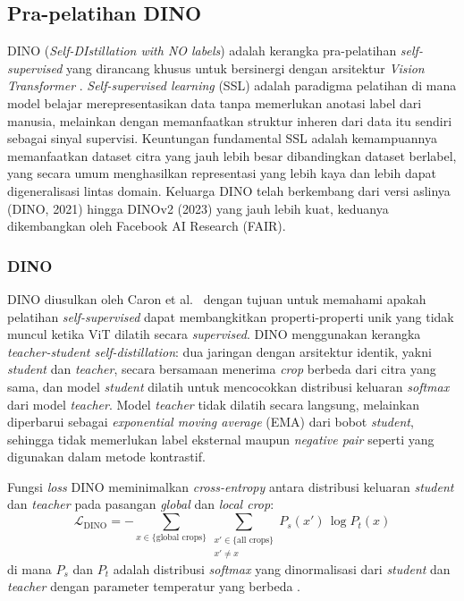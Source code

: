 \subsection{Pra-pelatihan DINO}
DINO (\textit{Self-DIstillation with NO labels}) adalah kerangka pra-pelatihan \textit{self-supervised} yang dirancang khusus untuk bersinergi dengan arsitektur \textit{Vision Transformer} \cite{caron2021dino}. \textit{Self-supervised learning} (SSL) adalah paradigma pelatihan di mana model belajar merepresentasikan data tanpa memerlukan anotasi label dari manusia, melainkan dengan memanfaatkan struktur inheren dari data itu sendiri sebagai sinyal supervisi. Keuntungan fundamental SSL adalah kemampuannya memanfaatkan dataset citra yang jauh lebih besar dibandingkan dataset berlabel, yang secara umum menghasilkan representasi yang lebih kaya dan lebih dapat digeneralisasi lintas domain. Keluarga DINO telah berkembang dari versi aslinya (DINO, 2021) hingga DINOv2 (2023) yang jauh lebih kuat, keduanya dikembangkan oleh Facebook AI Research (FAIR).
 
\subsubsection{DINO}
 
DINO diusulkan oleh Caron et al.\ \cite{caron2021dino} dengan tujuan untuk memahami apakah pelatihan \textit{self-supervised} dapat membangkitkan properti-properti unik yang tidak muncul ketika ViT dilatih secara \textit{supervised}. DINO menggunakan kerangka \textit{teacher-student self-distillation}: dua jaringan dengan arsitektur identik, yakni \textit{student} dan \textit{teacher}, secara bersamaan menerima \textit{crop} berbeda dari citra yang sama, dan model \textit{student} dilatih untuk mencocokkan distribusi keluaran \textit{softmax} dari model \textit{teacher}. Model \textit{teacher} tidak dilatih secara langsung, melainkan diperbarui sebagai \textit{exponential moving average} (EMA) dari bobot \textit{student}, sehingga tidak memerlukan label eksternal maupun \textit{negative pair} seperti yang digunakan dalam metode kontrastif.
 
Fungsi \textit{loss} DINO meminimalkan \textit{cross-entropy} antara distribusi keluaran \textit{student} dan \textit{teacher} pada pasangan \textit{global} dan \textit{local crop}:
\begin{equation}
    \mathcal{L}_{\text{DINO}}
    = -\sum_{x \in \{\text{global crops}\}}
      \sum_{\substack{x' \in \{\text{all crops}\} \\ x' \neq x}}
      P_s(x')\, \log P_t(x)
\end{equation}
di mana $P_s$ dan $P_t$ adalah distribusi \textit{softmax} yang dinormalisasi dari \textit{student} dan \textit{teacher} dengan parameter temperatur yang berbeda \cite{caron2021dino}.
 
